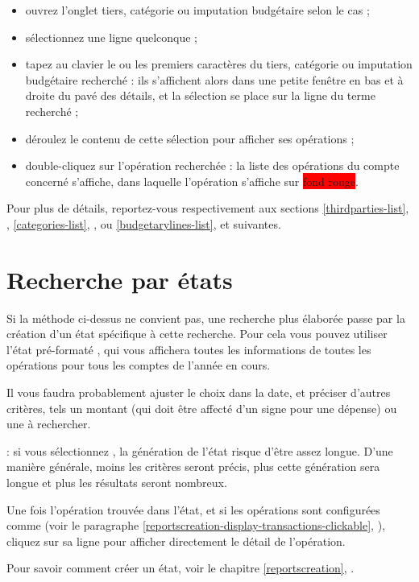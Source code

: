 \begin{itemize}
	 \item ouvrez l'onglet tiers, catégorie ou imputation budgétaire selon le cas ;
	 \item sélectionnez une ligne quelconque ;
	 \item tapez au clavier le ou les premiers caractères du tiers, catégorie ou imputation budgétaire recherché : ils s'affichent alors dans une petite fenêtre en bas et à droite du pavé des détails, et la sélection se place sur la ligne du terme recherché ;
	 \item déroulez le contenu de cette sélection pour afficher ses opérations ;
	 \item double-cliquez sur l'opération recherchée : la liste des opérations du compte concerné s'affiche, dans laquelle l'opération s'affiche sur \colorbox{red}{fond rouge}.	 	 	 
\end{itemize}


Pour plus de détails, reportez-vous respectivement aux sections \vref{thirdparties-list}, , \vref{categories-list}, , ou \vref{budgetarylines-list},  et suivantes.


\section{Recherche par états\label{search-advanced} }


Si la méthode ci-dessus ne convient pas, une recherche plus élaborée passe par la création d'un état spécifique à cette recherche. Pour cela vous pouvez utiliser l'état pré-formaté , qui vous affichera toutes les informations de toutes les opérations pour tous les comptes de  l'année en cours.

Il vous faudra probablement ajuster le choix dans la date, et préciser d'autres critères, tels un montant (qui doit être affecté d'un signe  pour une dépense) ou une  à rechercher. 

\Note{}: si vous sélectionnez , la génération de l'état risque d'être assez longue. D'une manière générale, moins les critères seront précis, plus cette génération sera longue et plus les résultats seront nombreux.

Une fois l'opération trouvée dans l'état, et si les opérations sont configurées comme  (voir le paragraphe \vref{reportscreation-display-transactions-clickable}, ), cliquez sur sa ligne pour afficher directement le détail de l'opération.

Pour savoir comment créer un état, voir le chapitre \vref{reportscreation}, .


